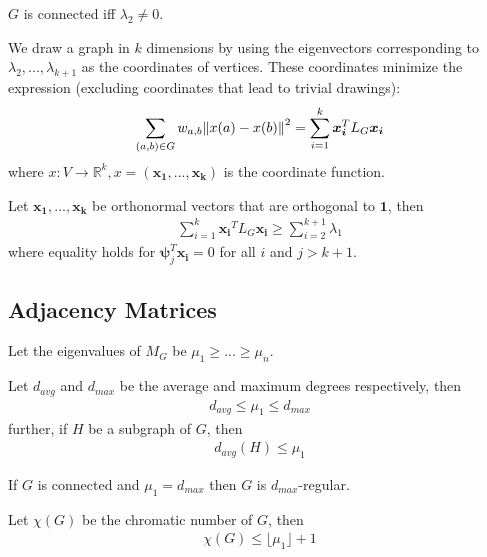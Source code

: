 \documentclass{math}
\renewcommand{\vec}[1]{\boldsymbol{#1}}
\begin{document}
\begin{lemma}
    $G$ is connected iff $\lambda_2 \neq 0$.
\end{lemma}

We draw a graph in $k$ dimensions by using the eigenvectors corresponding to $\lambda_2, ..., \lambda_{k+1}$ as the coordinates of vertices.
These coordinates minimize the expression (excluding coordinates that lead to trivial drawings):
\begin{align*}
    \sum_{(a, b) \in G} w_{a, b} \norm{x(a) - x(b)}^2 = \sum_{i=1}^{k} \vec{x_i}^T L_G \vec{x_i}
\end{align*}
where $x: V \to \mathbb{R}^k, x = (\vec{x_1}, ..., \vec{x_k})$ is the coordinate function.

\begin{theorem}
    Let $\vec{x_1}, ..., \vec{x_k}$ be orthonormal vectors that are orthogonal to $\vec{1}$, then
    \begin{align*}
        \sum_{i=1}^{k} \vec{x_i}^T L_G \vec{x_i} \geq \sum_{i=2}^{k + 1} \lambda_1
    \end{align*}
    where equality holds for $\vec{\psi}_j^T \vec{x_i} = 0$ for all $i$ and $j > k + 1$.
\end{theorem}

\subsection{Adjacency Matrices}

Let the eigenvalues of $M_G$ be $\mu_1 \geq ... \geq \mu_n$.

\begin{lemma}
    Let $d_{avg}$ and $d_{max}$ be the average and maximum degrees respectively, then
    \begin{align*}
        d_{avg} \leq \mu_1 \leq d_{max}
    \end{align*}
    further, if $H$ be a subgraph of $G$, then
    \begin{align*}
        d_{avg}(H) \leq \mu_1
    \end{align*}
\end{lemma}

\begin{lemma}
    If $G$ is connected and $\mu_1 = d_{max}$ then $G$ is $d_{max}$-regular.
\end{lemma}

\begin{theorem}
    Let $\chi(G)$ be the chromatic number of $G$, then
    \begin{align*}
        \chi(G) \leq \lfloor\mu_1\rfloor + 1
    \end{align*}
\end{theorem}
\end{document}
